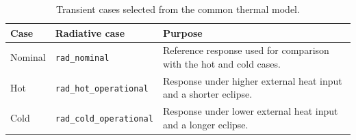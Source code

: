 \begin{table}[htbp]
    \centering
    \caption{Transient cases selected from the common thermal model.}
    \label{tab:transient_cases}

    \small
    \setlength{\tabcolsep}{6pt}
    \renewcommand{\arraystretch}{1.15}

    \begin{tabularx}{\textwidth}{
        |>{\raggedright\arraybackslash}p{}
        |>{\raggedright\arraybackslash}p{}
        |>{\raggedright\arraybackslash}X|
    }
        \hline
        \textbf{Case} &
        \textbf{Radiative case} &
        \textbf{Purpose} \\
        \hline

        Nominal &
        \texttt{rad\_nominal} &
        Reference response used for comparison with the hot and cold cases. \\
        \hline

        Hot &
        \texttt{rad\_hot\_operational} &
        Response under higher external heat input and a shorter eclipse. \\
        \hline

        Cold &
        \texttt{rad\_cold\_operational} &
        Response under lower external heat input and a longer eclipse. \\
        \hline
    \end{tabularx}
\end{table}